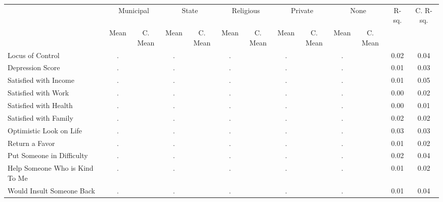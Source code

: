 \begin{tabular}{l c c c c c c c c c c c c}
\toprule
& \multicolumn{2}{c}{Municipal} & \multicolumn{2}{c}{State} & \multicolumn{2}{c}{Religious} & \multicolumn{2}{c}{Private} & \multicolumn{2}{c}{None} & R-sq. & C. R-sq. \\
& \scriptsize Mean & \scriptsize C. Mean & \scriptsize Mean & \scriptsize C. Mean & \scriptsize Mean & \scriptsize C. Mean & \scriptsize Mean & \scriptsize C. Mean & \scriptsize Mean & \scriptsize C. Mean & & \\
\midrule
Locus of Control &         . & &         . & &         . & &         . & &         . & &      0.02 &      0.04 \\
Depression Score &         . & &         . & &         . & &         . & &         . & &      0.01 &      0.03 \\
Satisfied with Income &         . & &         . & &         . & &         . & &         . & &      0.01 &      0.05 \\
Satisfied with Work &         . & &         . & &         . & &         . & &         . & &      0.00 &      0.02 \\
Satisfied with Health &         . & &         . & &         . & &         . & &         . & &      0.00 &      0.01 \\
Satisfied with Family &         . & &         . & &         . & &         . & &         . & &      0.02 &      0.02 \\
Optimistic Look on Life &         . & &         . & &         . & &         . & &         . & &      0.03 &      0.03 \\
Return a Favor &         . & &         . & &         . & &         . & &         . & &      0.01 &      0.02 \\
Put Someone in Difficulty &         . & &         . & &         . & &         . & &         . & &      0.02 &      0.04 \\
Help Someone Who is Kind To Me &         . & &         . & &         . & &         . & &         . & &      0.01 &      0.02 \\
Would Insult Someone Back &         . & &         . & &         . & &         . & &         . & &      0.01 &      0.04 \\
\bottomrule
\end{tabular}
